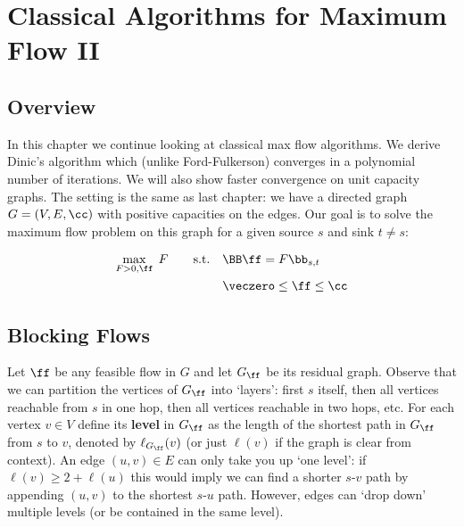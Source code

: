 %
%


\chapter{Classical
  Algorithms for Maximum Flow II}
\label{cha:maxflow2}

%

\sloppy

\section{Overview}
In this chapter we continue looking at classical max flow algorithms. We derive Dinic's algorithm which
(unlike Ford-Fulkerson) converges in a polynomial number of iterations. We will also show faster
convergence on unit capacity graphs.
The setting is the same as last chapter: we have a directed graph $G = (V, E, \cc)$ with
positive capacities
on the edges. Our goal is to solve the maximum flow problem on this graph for a given source $s$ and sink
$t \neq s$:

\begin{align}
  \begin{aligned}
    \max_{F>0, \ff} \;F\qquad\text{s.t.}\quad&\BB\ff = F\bb_{s,t} \\
    &\veczero\leq \ff\leq \cc
  \end{aligned}
\end{align}

\section{Blocking Flows}
Let $\ff$ be any feasible flow in $G$ and let $G_{\ff}$ be its residual graph.
Observe that we can partition the
vertices of $G_{\ff}$ into `layers': first $s$ itself, then all vertices reachable from $s$ in one hop, then all
vertices reachable in two hops, etc. For each vertex $v\in V$ define its \textbf{level} in $G_{\ff}$ as the
length of the shortest path in $G_{\ff}$ from $s$ to $v$, denoted by $\ell_{G_{\ff}}(v)$ (or just $\ell(v)$ if the
graph is clear from context). An edge $(u, v) \in E$ can only take you up `one level': if
$\ell(v) \geq 2+\ell(u)$ this would imply we can find a shorter $s$-$v$ path by appending $(u, v)$ to the
shortest $s$-$u$ path. However, edges can `drop down' multiple levels (or be contained in the same level).

